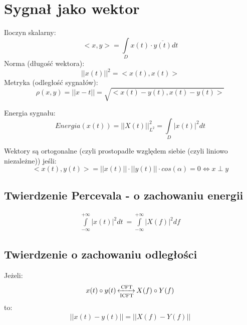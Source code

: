 \section{Sygnał jako wektor}
    Iloczyn skalarny:
    \begin{equation*}
        <x, y> = \int\limits_{D} x(t) \cdot \overline{y(t)} dt
    \end{equation*}
    Norma (długość wektora):
    \begin{equation*}
        ||x(t)||^2 = <x(t), x(t)>
    \end{equation*}
    Metryka (odległość sygnałów):
    \begin{equation*}
        \rho(x,y) = ||x-t|| = \sqrt{<x(t)-y(t), x(t)-y(t)>}
    \end{equation*}

    Energia sygnału:
    \begin{equation*}
        Energia(x(t)) = ||X(t)||^2_{L^2} = \int\limits_D |x(t)|^2dt
    \end{equation*}

    Wektory są ortogonalne (czyli prostopadłe względem siebie (czyli liniowo niezależne)) jeśli:
    \begin{equation*}
        <x(t), y(t)> = ||x(t)|| \cdot ||y(t)|| \cdot cos(\alpha) = 0 \Leftrightarrow x\perp y
    \end{equation*}


    \subsection{Twierdzenie Percevala - o zachowaniu energii}
        \begin{gather*}
            \int\limits^{+\infty}_{-\infty}|x(t)|^2 dt\ = \int\limits^{+\infty}_{-\infty}|X(f)|^2df
        \end{gather*}
    \subsection{Twierdzenie o zachowaniu odległości}
        Jeżeli:
        \begin{gather*}
            x(t)\circ y(t) \operatorname{\xleftrightarrow[\text{ICFT}]{\text{CFT}}} X(f)\circ Y(f)
        \end{gather*}
        to:
        \begin{gather*}
            ||x(t) - y(t)|| = ||X(f) - Y(f)||
        \end{gather*}

